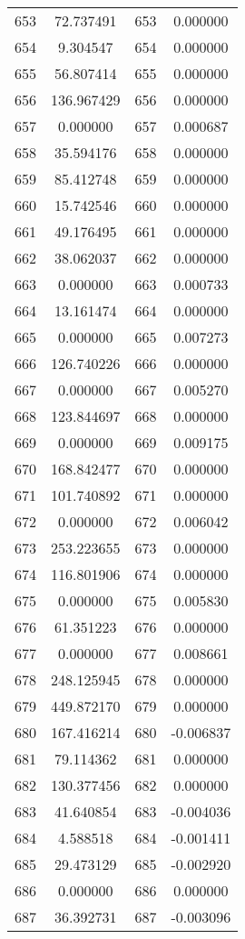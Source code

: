 \documentclass[12pt]{article}
\begin{document}
\begin{longtable}{@{}cccc@{}}
653 & 72.737491 & 653 & 0.000000 \\
654 & 9.304547 & 654 & 0.000000 \\
655 & 56.807414 & 655 & 0.000000 \\
656 & 136.967429 & 656 & 0.000000 \\
657 & 0.000000 & 657 & 0.000687 \\
658 & 35.594176 & 658 & 0.000000 \\
659 & 85.412748 & 659 & 0.000000 \\
660 & 15.742546 & 660 & 0.000000 \\
661 & 49.176495 & 661 & 0.000000 \\
662 & 38.062037 & 662 & 0.000000 \\
663 & 0.000000 & 663 & 0.000733 \\
664 & 13.161474 & 664 & 0.000000 \\
665 & 0.000000 & 665 & 0.007273 \\
666 & 126.740226 & 666 & 0.000000 \\
667 & 0.000000 & 667 & 0.005270 \\
668 & 123.844697 & 668 & 0.000000 \\
669 & 0.000000 & 669 & 0.009175 \\
670 & 168.842477 & 670 & 0.000000 \\
671 & 101.740892 & 671 & 0.000000 \\
672 & 0.000000 & 672 & 0.006042 \\
673 & 253.223655 & 673 & 0.000000 \\
674 & 116.801906 & 674 & 0.000000 \\
675 & 0.000000 & 675 & 0.005830 \\
676 & 61.351223 & 676 & 0.000000 \\
677 & 0.000000 & 677 & 0.008661 \\
678 & 248.125945 & 678 & 0.000000 \\
679 & 449.872170 & 679 & 0.000000 \\
680 & 167.416214 & 680 & -0.006837 \\
681 & 79.114362 & 681 & 0.000000 \\
682 & 130.377456 & 682 & 0.000000 \\
683 & 41.640854 & 683 & -0.004036 \\
684 & 4.588518 & 684 & -0.001411 \\
685 & 29.473129 & 685 & -0.002920 \\
686 & 0.000000 & 686 & 0.000000 \\
687 & 36.392731 & 687 & -0.003096 \\

\end{longtable}
\end{document}
